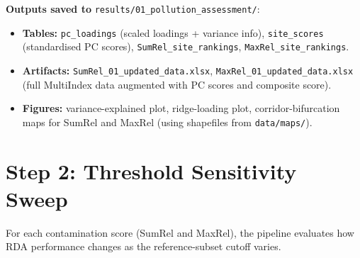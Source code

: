 \documentclass[11pt]{article}
\begin{document}
\noindent
\textbf{Outputs saved to} \texttt{results/01\_pollution\_assessment/}:
\begin{itemize}[leftmargin=*]
  \item \textbf{Tables:}
    \texttt{pc\_loadings} (scaled loadings + variance info),
    \texttt{site\_scores} (standardised PC scores),
    \texttt{SumRel\_site\_rankings},
    \texttt{MaxRel\_site\_rankings}.
  \item \textbf{Artifacts:}
    \texttt{SumRel\_01\_updated\_data.xlsx},
    \texttt{MaxRel\_01\_updated\_data.xlsx}
    (full MultiIndex data augmented with PC scores and composite score).
  \item \textbf{Figures:}
    variance-explained plot,
    ridge-loading plot,
    corridor-bifurcation maps for SumRel and MaxRel (using shapefiles
    from \texttt{data/maps/}).
\end{itemize}

\section{Step 2: Threshold Sensitivity Sweep}

For each contamination score (SumRel and MaxRel), the pipeline
evaluates how RDA performance changes as the reference-subset cutoff
varies.
\end{document}
